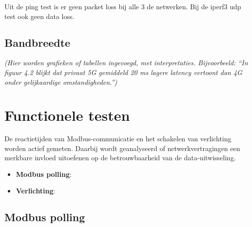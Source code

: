 Uit de ping test is er geen packet loss bij alle 3 de netwerken. Bij de iperf3 udp test ook geen data loss.

\subsection{Bandbreedte}



\textit{(Hier worden grafieken of tabellen ingevoegd, met interpretaties. Bijvoorbeeld: “In figuur 4.2 blijkt dat privaat 5G gemiddeld 20 ms lagere latency vertoont dan 4G onder gelijkaardige omstandigheden.”)}

\section{Functionele testen}

De reactietijden van Modbus-communicatie en het schakelen van verlichting worden actief gemeten. Daarbij wordt geanalyseerd of netwerkvertragingen een merkbare invloed uitoefenen op de betrouwbaarheid van de data-uitwisseling.

\begin{itemize}
    \item \textbf{Modbus polling}: 
    \item \textbf{Verlichting}: 
\end{itemize}
\subsection{Modbus polling}
%
%
%
%
%
%
%
%
%
%

